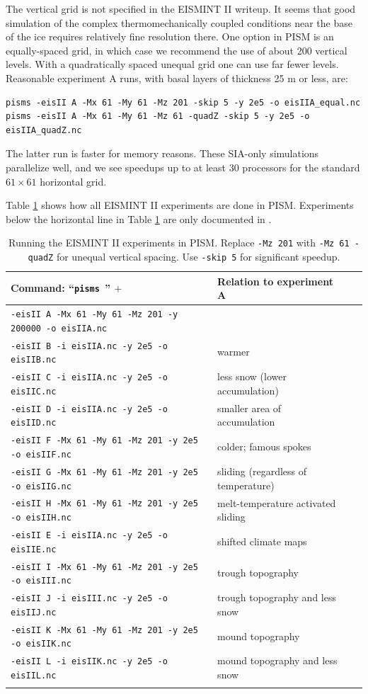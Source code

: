 \documentclass[11pt,final]{amsart}
\renewcommand{\t}[1]{\texttt{#1}}
\begin{document}
The vertical grid is not specified in the EISMINT II writeup.  It seems that good simulation of the complex thermomechanically coupled conditions near the base of the ice requires relatively fine resolution there.  One option in PISM is an equally-spaced grid, in which case we recommend the use of about 200 vertical levels.  With a quadratically spaced unequal grid one can use far fewer levels.  Reasonable experiment A runs, with basal layers of thickness 25 m or less, are:

\begin{verbatim}
pisms -eisII A -Mx 61 -My 61 -Mz 201 -skip 5 -y 2e5 -o eisIIA_equal.nc
pisms -eisII A -Mx 61 -My 61 -Mz 61 -quadZ -skip 5 -y 2e5 -o eisIIA_quadZ.nc
\end{verbatim}
\noindent The latter run is faster for memory reasons.  These SIA-only simulations parallelize well, and we see speedups up to at least 30 processors for the standard $61\times 61$ horizontal grid.

Table \ref{tab:eisII} shows how all EISMINT II experiments are done in PISM.  Experiments below the horizontal line in Table \ref{tab:eisII} are only documented in \cite{EISIIdescribe}.

\begin{table}[ht]
\caption{Running the EISMINT II experiments in PISM.  Replace \t{-Mz 201} with \t{-Mz 61 -quadZ} for unequal vertical spacing.  Use \t{-skip 5} for significant speedup.}\label{tab:eisII}
\small
\begin{tabular}{@{}llll}\hline
\textbf{Command: ``\t{pisms }'' $+$} & \textbf{Relation to experiment A} \\ \hline
\verb|-eisII A -Mx 61 -My 61 -Mz 201 -y 200000 -o eisIIA.nc| & \\
\verb|-eisII B -i eisIIA.nc -y 2e5 -o eisIIB.nc| & warmer \\
\verb|-eisII C -i eisIIA.nc -y 2e5 -o eisIIC.nc| & less snow (lower accumulation)\\
\verb|-eisII D -i eisIIA.nc -y 2e5 -o eisIID.nc| & smaller area of accumulation \\
\verb|-eisII F -Mx 61 -My 61 -Mz 201 -y 2e5 -o eisIIF.nc| & colder; famous spokes \cite{BBL} \\
\verb|-eisII G -Mx 61 -My 61 -Mz 201 -y 2e5 -o eisIIG.nc| & sliding (regardless of temperature) \\
\verb|-eisII H -Mx 61 -My 61 -Mz 201 -y 2e5 -o eisIIH.nc| & melt-temperature activated sliding \\ \hline
\verb|-eisII E -i eisIIA.nc -y 2e5 -o eisIIE.nc| & shifted climate maps \\
\verb|-eisII I -Mx 61 -My 61 -Mz 201 -y 2e5 -o eisIII.nc| & trough topography \\
\verb|-eisII J -i eisIII.nc -y 2e5 -o eisIIJ.nc| & trough topography and less snow \\
\verb|-eisII K -Mx 61 -My 61 -Mz 201 -y 2e5 -o eisIIK.nc| & mound topography \\
\verb|-eisII L -i eisIIK.nc -y 2e5 -o eisIIL.nc| & mound topography and less snow \\
\hline\normalsize
\end{tabular}\end{table}
\end{document}

